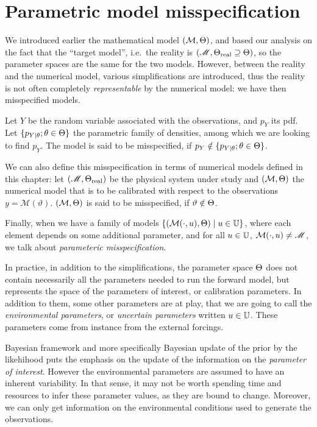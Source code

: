 \documentclass[../../Main_ManuscritThese.tex]{subfiles}
\begin{document}
\section{Parametric model misspecification}
\label{sec:model_misspecification}
We introduced earlier the mathematical model $(\mathcal{M},\Theta)$, and based our analysis on the fact that the ``target model'', i.e.\ the reality is $(\mathscr{M},\Theta_{\mathrm{real}} \supseteq \Theta)$, so the parameter spaces are the same for the two models. However, between the reality and the numerical model, various simplifications are introduced, thus the reality is not often completely \emph{representable} by the numerical model: we have then misspecified models.

\begin{definition}
  Let $Y$ be the random variable associated with the observations, and $p_Y$ its pdf. Let $\{p_{Y \mid \theta} ; \theta \in \Theta\}$ the parametric family of densities, among which we are looking to find $p_Y$. The model is said to be misspecified, if $p_Y \notin \{p_{Y \mid \theta} ; \theta \in \Theta\}$.

  We can also define this misspecification in terms of numerical models defined in this chapter:  
  let $(\mathscr{M},\Theta_{\mathrm{real}})$ be the physical system under study and $(\mathcal{M},\Theta)$ the numerical model that is to be calibrated with respect to the observations $y=\mathscr{M}(\vartheta)$. $(\mathcal{M}, \Theta)$ is said to be misspecified, if $\vartheta \notin \Theta$.

  Finally, when we have a family of models $\{(\mathcal{M}(\cdot, u),\Theta) \mid u \in\mathbb{U}\}$, where each element depends on some additional parameter, and for all $u\in \mathbb{U}$, $\mathcal{M}(\cdot,u) \neq \mathscr{M}$, we talk about \emph{parameteric misspecification}.
\end{definition}

In practice, in addition to the simplifications, the parameter space
$\Theta$ does not contain necessarily all the parameters needed to run
the forward model, but represents the space of the parameters of
interest, or calibration parameters. In addition to them, some other
parameters are at play, that we are going to call the
\emph{environmental parameters}, or \emph{uncertain parameters}
written $u\in \mathbb{U}$. These parameters come from instance from the
external forcings.



Bayesian framework and more specifically Bayesian update of the prior
by the likehihood puts the emphasis on the update of the information
on the \emph{parameter of interest}. However the environmental
parameters are assumed to have an inherent variability. In that sense,
it may not be worth spending time and resources to infer these
parameter values, as they are bound to change.  Moreover, we can only
get information on the environmental conditions used to generate the
observations.
\end{document}
